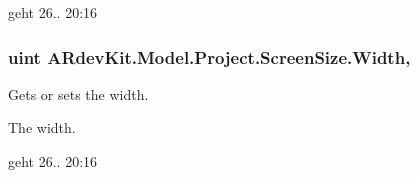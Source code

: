 geht 26.. 20\-:16\hypertarget{class_a_rdev_kit_1_1_model_1_1_project_1_1_screen_size_af2592dc42f39f94de6c14385b2d8f55d}{
\subsubsection[{Width}]{\setlength{\rightskip}{0pt plus 5cm}uint A\-Rdev\-Kit.\-Model.\-Project.\-Screen\-Size.\-Width\hspace{0.3cm}{\ttfamily [get]}, {\ttfamily [set]}}}\label{class_a_rdev_kit_1_1_model_1_1_project_1_1_screen_size_af2592dc42f39f94de6c14385b2d8f55d}


Gets or sets the width. 

The width. 

geht 26.. 20\-:16